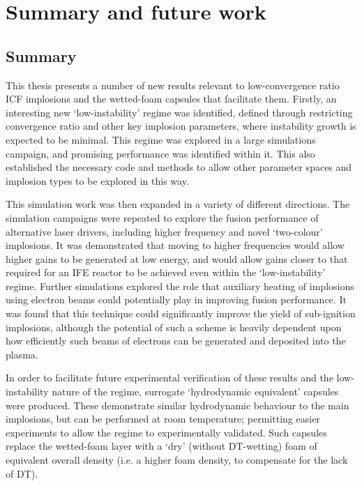 

\chapter{Summary and future work} \label{ch:Conclusion}

\minitoc

\section{Summary}

This thesis presents a number of new results relevant to low-convergence ratio ICF implosions and the wetted-foam capsules that facilitate them. Firstly, an interesting new `low-instability' regime was identified, defined through restricting convergence ratio and other key implosion parameters, where instability growth is expected to be minimal. This regime was explored in a large simulations campaign, and promising performance was identified within it. This also established the necessary code and methods to allow other parameter spaces and implosion types to be explored in this way.

This simulation work was then expanded in a variety of different directions. The simulation campaigns were repeated to explore the fusion performance of alternative laser drivers, including higher frequency and novel `two-colour' implosions. It was demonstrated that moving to higher frequencies would allow higher gains to be generated at low energy, and would allow gains closer to that required for an IFE reactor to be achieved even within the `low-instability' regime. Further simulations explored the role that auxiliary heating of implosions using electron beams could potentially play in improving fusion performance. It was found that this technique could significantly improve the yield of sub-ignition implosions, although the potential of such a scheme is heavily dependent upon how efficiently such beams of electrons can be generated and deposited into the plasma.

In order to facilitate future experimental verification of these results and the low-instability nature of the regime, surrogate `hydrodynamic equivalent' capsules were produced. These demonstrate similar hydrodynamic behaviour to the main implosions, but can be performed at room temperature; permitting easier experiments to allow the regime to experimentally validated. Such capsules replace the wetted-foam layer with a `dry' (without DT-wetting) foam of equivalent overall density (i.e. a higher foam density, to compensate for the lack of DT).

